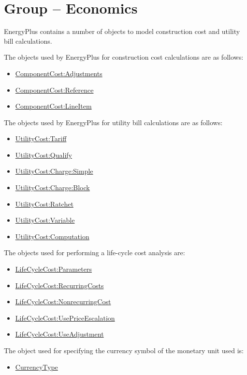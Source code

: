 \section{Group -- Economics}\label{group-economics}

EnergyPlus contains a number of objects to model construction cost and utility bill calculations.

The objects used by EnergyPlus for construction cost calculations are as follows:

\begin{itemize}
\item
  \hyperref[componentcostadjustments]{ComponentCost:Adjustments}
\item
  \hyperref[componentcostreference]{ComponentCost:Reference}
\item
  \hyperref[componentcostlineitem]{ComponentCost:LineItem}
\end{itemize}

The objects used by EnergyPlus for utility bill calculations are as follows:

\begin{itemize}
\item
  \hyperref[utilitycosttariff]{UtilityCost:Tariff}
\item
  \hyperref[utilitycostqualify]{UtilityCost:Qualify}
\item
  \hyperref[utilitycostchargesimple]{UtilityCost:Charge:Simple}
\item
  \hyperref[utilitycostchargeblock]{UtilityCost:Charge:Block}
\item
  \hyperref[utilitycostratchet]{UtilityCost:Ratchet}
\item
  \hyperref[utilitycostvariable]{UtilityCost:Variable}
\item
  \hyperref[utilitycostcomputation]{UtilityCost:Computation}
\end{itemize}

The objects used for performing a life-cycle cost analysis are:

\begin{itemize}
\item
  \hyperref[lifecyclecostparameters]{LifeCycleCost:Parameters}
\item
  \hyperref[lifecyclecostrecurringcosts]{LifeCycleCost:RecurringCosts}
\item
  \hyperref[lifecyclecostnonrecurringcost]{LifeCycleCost:NonrecurringCost}
\item
  \hyperref[lifecyclecostusepriceescalation]{LifeCycleCost:UsePriceEscalation}
\item
  \hyperref[lifecyclecostuseadjustment]{LifeCycleCost:UseAdjustment}
\end{itemize}

The object used for specifying the currency symbol of the monetary unit used is:

\begin{itemize}
\tightlist
\item
  \hyperref[currencytype]{CurrencyType}
\end{itemize}